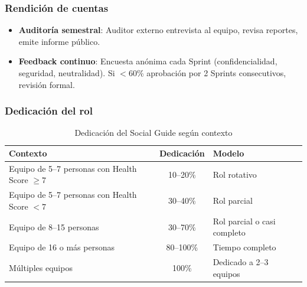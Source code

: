 \subsubsection{Rendición de cuentas}

\begin{itemize}
    \item \textbf{Auditoría semestral}: Auditor externo entrevista al equipo, revisa reportes, emite informe público.
    \item \textbf{Feedback continuo}: Encuesta anónima cada Sprint (confidencialidad, seguridad, neutralidad). Si $<$60\% aprobación por 2 Sprints consecutivos, revisión formal.
\end{itemize}

\subsubsection{Dedicación del rol}

\begin{table}[h]
    \centering
    \small
    \begin{tabularx}{\textwidth}{|X|c|l|}
        \hline
        \textbf{Contexto} & \textbf{Dedicación}         & \textbf{Modelo} \\
        \hline
        Equipo de 5--7 personas con Health Score $\geq 7$
                          & 10--20\%
                          & Rol rotativo                                  \\
        \hline
        Equipo de 5--7 personas con Health Score $< 7$
                          & 30--40\%
                          & Rol parcial                                   \\
        \hline
        Equipo de 8--15 personas
                          & 30--70\%
                          & Rol parcial o casi completo                   \\
        \hline
        Equipo de 16 o más personas
                          & 80--100\%
                          & Tiempo completo                               \\
        \hline
        Múltiples equipos
                          & 100\%
                          & Dedicado a 2--3 equipos                       \\
        \hline
    \end{tabularx}
    \caption{Dedicación del Social Guide según contexto}
    \label{tab:dedicacion-social-guide}
\end{table}

